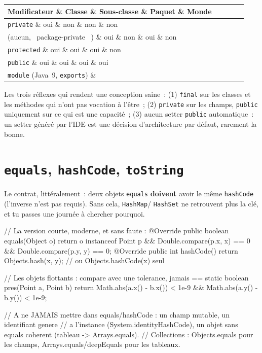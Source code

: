 \documentclass[12pt,a4paper,twoside,openright]{book}
\makeatletter
\newenvironment{tabz}[1]{\rowcolors{2}{white}{tralight}%
  \small\setlength{\tabcolsep}{5pt}\setlength{\LTpre}{3pt}\setlength{\LTpost}{3pt}%
  \begin{longtable}{@{}#1@{}}\toprule}
  {\bottomrule\end{longtable}\normalfont\setlength{\tabcolsep}{6pt}}
\newcommand{\thd}[1]{\textbf{\color{white}#1}}
\newcommand{\headrow}{\rowcolor{theadbg}}
\makeatother
\begin{document}
\begin{tabz}{lXXXX}
  \headrow \thd{Modificateur} \& \thd{Classe} \& \thd{Sous-classe} \& \thd{Paquet} \& \thd{Monde} \\
  \midrule
  \verb|private| \& oui \& non \& non \& non \\
  (aucun, \og ~package-private~ \fg{}) \& oui \& non \& oui \& non \\
  \verb|protected| \& oui \& oui \& oui \& non \\
  \verb|public| \& oui \& oui \& oui \& oui \\
  \verb|module| (Java~9, \verb|exports|) \& \multicolumn{4}{p{0.6\textwidth}}{uniquement avec \verb|module-info.java| : contr\^ole entre modules} \\
\end{tabz}

Les trois r\'eflexes qui rendent une conception saine~: (1) \verb|final| sur les classes et les
m\'ethodes qui n'ont pas vocation \`a l'\^etre~; (2) \verb|private| sur les champs, \verb|public|
uniquement sur ce qui est une capacit\'e~; (3) aucun setter \verb|public| automatique~: un setter
g\'en\'er\'e par l'IDE est une d\'ecision d'architecture par d\'efaut, rarement la bonne.

\section{\texttt{equals}, \texttt{hashCode}, \texttt{toString}}

Le contrat, litt\'eralement~: deux objets \verb|equals| \textbf{doivent} avoir le m\^eme
\verb|hashCode| (l'inverse n'est pas requis). Sans cela, \verb|HashMap|/ \verb|HashSet|
ne retrouvent plus la cl\'e, et tu passes une journ\'ee \`a chercher pourquoi.

\begin{codejava}
// La version courte, moderne, et sans faute :
@Override public boolean equals(Object o) {
    return o instanceof Point p && Double.compare(p.x, x) == 0 && Double.compare(p.y, y) == 0;
}
@Override public int hashCode() { return Objects.hash(x, y); }      // ou Objects.hashCode(x) seul

// Les objets flottants : compare avec une tolerance, jamais ==
static boolean pres(Point a, Point b) {
    return Math.abs(a.x() - b.x()) < 1e-9 && Math.abs(a.y() - b.y()) < 1e-9;
}

// A ne JAMAIS mettre dans equals/hashCode : un champ mutable, un identifiant genere
// a l'instance (System.identityHashCode), un objet sans equals coherent (tableau -> Arrays.equals).
// Collections : Objects.equals pour les champs, Arrays.equals/deepEquals pour les tableaux.
\end{codejava}
\end{document}
